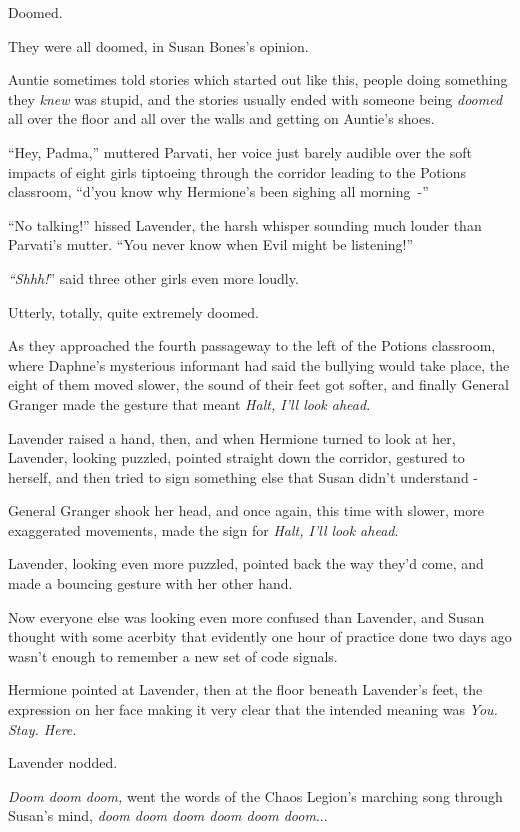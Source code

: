 Doomed.

They were all doomed, in Susan Bones's opinion.

Auntie sometimes told stories which started out like this, people doing something they \emph{knew} was stupid, and the stories usually ended with someone being \emph{doomed} all over the floor and all over the walls and getting on Auntie's shoes.

``Hey, Padma,'' muttered Parvati, her voice just barely audible over the soft impacts of eight girls tiptoeing through the corridor leading to the Potions classroom, ``d'you know why Hermione's been sighing all morning~-''

``No talking!'' hissed Lavender, the harsh whisper sounding much louder than Parvati's mutter. ``You never know when Evil might be listening!''

\emph{``Shhh!}'' said three other girls even more loudly.

Utterly, totally, quite extremely doomed.

As they approached the fourth passageway to the left of the Potions classroom, where Daphne's mysterious informant had said the bullying would take place, the eight of them moved slower, the sound of their feet got softer, and finally General Granger made the gesture that meant \emph{Halt, I'll look ahead}.

Lavender raised a hand, then, and when Hermione turned to look at her, Lavender, looking puzzled, pointed straight down the corridor, gestured to herself, and then tried to sign something else that Susan didn't understand -

General Granger shook her head, and once again, this time with slower, more exaggerated movements, made the sign for \emph{Halt, I'll look ahead}.

Lavender, looking even more puzzled, pointed back the way they'd come, and made a bouncing gesture with her other hand.

Now everyone else was looking even more confused than Lavender, and Susan thought with some acerbity that evidently one hour of practice done two days ago wasn't enough to remember a new set of code signals.

Hermione pointed at Lavender, then at the floor beneath Lavender's feet, the expression on her face making it very clear that the intended meaning was \emph{You. Stay. Here.}

Lavender nodded.

\emph{Doom doom doom,} went the words of the Chaos Legion's marching song through Susan's mind, \emph{doom doom doom doom doom doom}...

